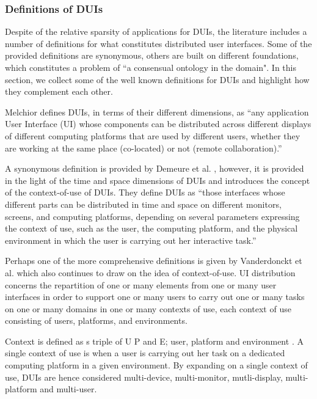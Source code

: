 \subsubsection{Definitions of DUIs}
Despite of the relative sparsity of applications for DUIs, the literature
includes a number of definitions for what constitutes distributed user interfaces. Some of the provided definitions are synonymous, others are
built on different foundations, which constitutes a problem of ``a consensual
ontology in the domain"\cite{vanderdonckt2010distributed}. In this section, we
collect some of the well known definitions for DUIs and highlight how they
complement each other.\par
Melchior \cite{melchior2011distributed} defines DUIs, in terms of their
different dimensions, as ``any application User Interface (UI) whose components
can be distributed across different displays of different computing platforms that are used by different users, whether they are working at the same place (co-located) or not (remote collaboration).''\par
A synonymous definition is provided by Demeure et al. \cite{demeure20084c},
however, it is provided in the light of the time and space dimensions of DUIs
and introduces the concept of the context-of-use of DUIs.
They define DUIs as ``those interfaces whose different parts can be distributed in time and space on different monitors, screens, and computing platforms, depending on several parameters expressing the context of use, such as the user, the computing platform, and the physical environment in which the user is carrying out her interactive task.'' \par 
Perhaps one of the more comprehensive definitions is given by Vanderdonckt et
al. \cite{vanderdonckt2010distributed} which also continues to draw on the idea of context-of-use. UI distribution
concerns the repartition of one or many elements from one or many user interfaces in order to support one or many users to carry out one or many tasks on one or many domains in one or many contexts of use, each context of use consisting of users, platforms, and environments.\par
Context is defined as s triple of U P and E; user, platform and
environment \cite{vanderdonckt2010distributed}. A single context of
use is when a user is carrying out her task on a dedicated computing platform in
a given environment. By expanding on a single context of use, DUIs are hence
considered  multi-device, multi-monitor, mutli-display,
multi-platform and multi-user. \cite{vanderdonckt2010distributed}\par
